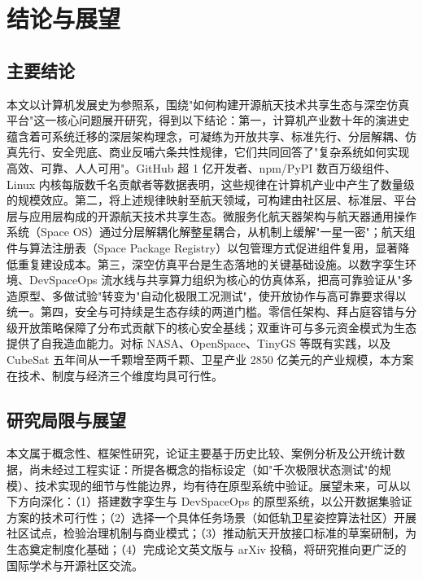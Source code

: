\documentclass[UTF8,a4paper,zihao=-4]{ctexart}
\begin{document}
\section{结论与展望}
\subsection{主要结论}
本文以计算机发展史为参照系，围绕"如何构建开源航天技术共享生态与深空仿真平台"这一核心问题展开研究，得到以下结论：第一，计算机产业数十年的演进史蕴含着可系统迁移的深层架构理念，可凝练为开放共享、标准先行、分层解耦、仿真先行、安全兜底、商业反哺六条共性规律，它们共同回答了"复杂系统如何实现高效、可靠、人人可用"。GitHub 超 1 亿开发者、npm/PyPI 数百万级组件、Linux 内核每版数千名贡献者等数据表明，这些规律在计算机产业中产生了数量级的规模效应。第二，将上述规律映射至航天领域，可构建由社区层、标准层、平台层与应用层构成的开源航天技术共享生态。微服务化航天器架构与航天器通用操作系统（Space OS）通过分层解耦化解整星耦合，从机制上缓解"一星一密"；航天组件与算法注册表（Space Package Registry）以包管理方式促进组件复用，显著降低重复建设成本。第三，深空仿真平台是生态落地的关键基础设施。以数字孪生环境、DevSpaceOps 流水线与共享算力组织为核心的仿真体系，把高可靠验证从"多造原型、多做试验"转变为"自动化极限工况测试"，使开放协作与高可靠要求得以统一。第四，安全与可持续是生态存续的两道门槛。零信任架构、拜占庭容错与分级开放策略保障了分布式贡献下的核心安全基线；双重许可与多元资金模式为生态提供了自我造血能力。对标 NASA、OpenSpace、TinyGS 等既有实践，以及 CubeSat 五年间从一千颗增至两千颗、卫星产业 2850 亿美元的产业规模\cite{kulu2024,sia2024}，本方案在技术、制度与经济三个维度均具可行性。

\subsection{研究局限与展望}
本文属于概念性、框架性研究，论证主要基于历史比较、案例分析及公开统计数据，尚未经过工程实证：所提各概念的指标设定（如"千次极限状态测试"的规模）、技术实现的细节与性能边界，均有待在原型系统中验证。展望未来，可从以下方向深化：（1）搭建数字孪生与 DevSpaceOps 的原型系统，以公开数据集验证方案的技术可行性；（2）选择一个具体任务场景（如低轨卫星姿控算法社区）开展社区试点，检验治理机制与商业模式；（3）推动航天开放接口标准的草案研制，为生态奠定制度化基础；（4）完成论文英文版与 arXiv 投稿，将研究推向更广泛的国际学术与开源社区交流。
\end{document}
